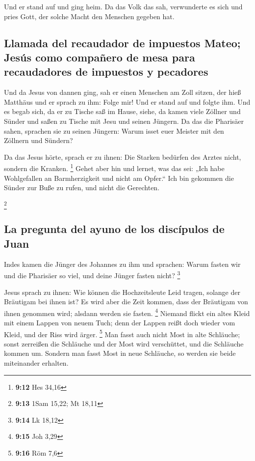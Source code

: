  Und er stand auf und ging heim.  Da das
Volk das sah, verwunderte es sich und pries Gott, der solche Macht den
Menschen gegeben hat.

\hypertarget{llamada-del-recaudador-de-impuestos-mateo-jesuxfas-como-compauxf1ero-de-mesa-para-recaudadores-de-impuestos-y-pecadores}{%
\subsection{Llamada del recaudador de impuestos Mateo; Jesús como
compañero de mesa para recaudadores de impuestos y
pecadores}\label{llamada-del-recaudador-de-impuestos-mateo-jesuxfas-como-compauxf1ero-de-mesa-para-recaudadores-de-impuestos-y-pecadores}}

 Und da Jesus von dannen ging, sah er einen Menschen am
Zoll sitzen, der hieß Matthäus und er sprach zu ihm: Folge mir! Und er
stand auf und folgte ihm.  Und es begab sich, da er zu
Tische saß im Hause, siehe, da kamen viele Zöllner und Sünder und saßen
zu Tische mit Jesu und seinen Jüngern.  Da das die
Pharisäer sahen, sprachen sie zu seinen Jüngern: Warum isset euer
Meister mit den Zöllnern und Sündern?

 Da das Jesus hörte, sprach er zu ihnen: Die Starken
bedürfen des Arztes nicht, sondern die Kranken. \footnote{\textbf{9:12}
  Hes 34,16}  Gehet aber hin und lernet, was das sei:
„Ich habe Wohlgefallen an Barmherzigkeit und nicht am Opfer.`` Ich bin
gekommen die Sünder zur Buße zu rufen, und nicht die Gerechten.

\footnote{\textbf{9:13} 1Sam 15,22; Mt 18,11}

\hypertarget{la-pregunta-del-ayuno-de-los-discuxedpulos-de-juan}{%
\subsection{La pregunta del ayuno de los discípulos de
Juan}\label{la-pregunta-del-ayuno-de-los-discuxedpulos-de-juan}}

 Indes kamen die Jünger des Johannes zu ihm und sprachen:
Warum fasten wir und die Pharisäer so viel, und deine Jünger fasten
nicht? \footnote{\textbf{9:14} Lk 18,12}

 Jesus sprach zu ihnen: Wie können die Hochzeitsleute
Leid tragen, solange der Bräutigam bei ihnen ist? Es wird aber die Zeit
kommen, dass der Bräutigam von ihnen genommen wird; alsdann werden sie
fasten. \footnote{\textbf{9:15} Joh 3,29}  Niemand flickt
ein altes Kleid mit einem Lappen von neuem Tuch; denn der Lappen reißt
doch wieder vom Kleid, und der Riss wird ärger. \footnote{\textbf{9:16}
  Röm 7,6}  Man fasst auch nicht Most in alte Schläuche;
sonst zerreißen die Schläuche und der Most wird verschüttet, und die
Schläuche kommen um. Sondern man fasst Most in neue Schläuche, so werden
sie beide miteinander erhalten.

